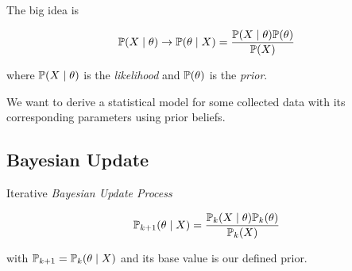 The big idea is 

\[
    \mathbb{P}(X \mid\theta) \to \mathbb{P}(\theta \mid X) = \frac{\mathbb{P}(X \mid \theta) \mathbb{P}(\theta)}{\mathbb{P}(X)}
\]

where \(\mathbb{P}(X \mid \theta)\) is the \emph{likelihood} and \(\mathbb{P}(\theta)\) is the \emph{prior}.

We want to derive a statistical model for some collected data with its corresponding parameters 
using prior beliefs.

\subsection{Bayesian Update}

Iterative \emph{Bayesian Update Process}

\[
    \mathbb{P}_{k + 1}(\theta \mid X) = \frac{\mathbb{P}_k(X \mid \theta) \mathbb{P}_k(\theta)}{\mathbb{P}_k(X)}
\]

with \(\mathbb{P}_{k + 1} = \mathbb{P}_k(\theta \mid X)\) and its base value is our defined prior.





